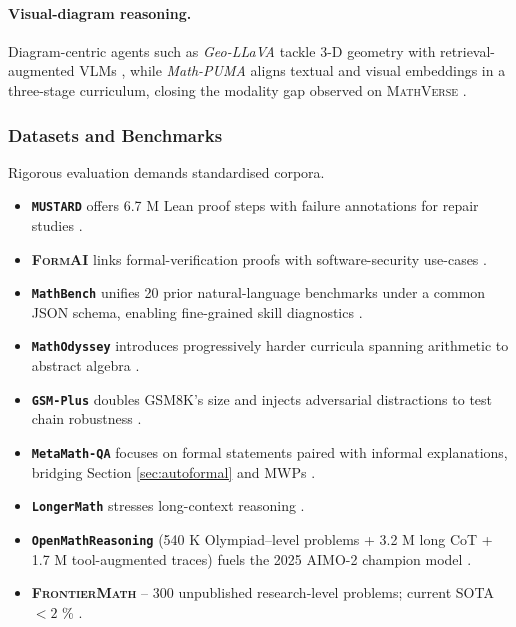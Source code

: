 \documentclass[acmsmall,anonymous]{acmart}
\begin{document}
\paragraph{Visual-diagram reasoning.} Diagram-centric agents such as \emph{Geo-LLaVA} tackle 3-D geometry with retrieval-augmented VLMs \cite{gao2024geollava}, while \emph{Math-PUMA} aligns textual and visual embeddings in a three-stage curriculum, closing the modality gap observed on \textsc{MathVerse} \cite{zhuang2025mathpuma}.

\subsubsection{Datasets and Benchmarks}\label{sec:datasets}
Rigorous evaluation demands standardised corpora.

\begin{itemize}
    \item \textbf{\texttt{MUSTARD}} offers 6.7 M Lean proof steps with failure annotations for repair studies \cite{huang2024mustard}. 
    \item \textbf{\textsc{FormAI}} links formal-verification proofs with software-security use-cases \cite{johnson2024formai}.
    \item \textbf{\texttt{MathBench}} unifies 20 prior natural-language benchmarks under a common JSON schema, enabling fine-grained skill diagnostics \cite{yang2024mathbench}.  
    \item \textbf{\texttt{MathOdyssey}} introduces progressively harder curricula spanning arithmetic to abstract algebra \cite{zhang2024mathodyssey,zhang2024mathodyssey}.  
    \item \textbf{\texttt{GSM-Plus}} doubles GSM8K’s size and injects adversarial distractions to test chain robustness \cite{li2024gsmplus}.  
    \item \textbf{\texttt{MetaMath-QA}} focuses on formal statements paired with informal explanations, bridging Section \ref{sec:autoformal} and MWPs \cite{metamath2024,yu2024metamath}.
    \item \textbf{\texttt{LongerMath}} stresses long-context reasoning \cite{liu2024llmslongermath}.
    \item \textbf{\texttt{OpenMathReasoning}} (540 K Olympiad–level problems + 3.2 M long CoT + 1.7 M tool-augmented traces) fuels the 2025 AIMO-2 champion model \cite{Moshkov2025OpenMath}.
    \item \textbf{\textsc{FrontierMath}} – 300 unpublished research-level problems; current SOTA $<2$ \% \cite{Glazer2025FrontierMath}.

\end{itemize}
\end{document}
